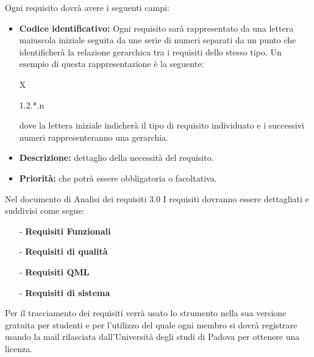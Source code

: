 \documentclass[a4paper,11pt]{article}
\begin{document}
			Ogni requisito dovrà avere i seguenti campi:
			\begin{itemize}
			\item \textbf{Codice identificativo:} 
			Ogni requisito sarà rappresentato da una lettera maiuscola iniziale seguita da une serie di numeri separati da un punto che identificherà la relazione gerarchica tra i requisiti dello stesso tipo. Un esempio di questa rappresentazione è la seguente:
					\begin{center}
					\begin{Large} X\end{Large}  \begin{normalsize}1.2.*.n	\end{normalsize}					
					\end{center}
					dove la lettera iniziale indicherà il tipo di requisito individuato e i successivi numeri rappresenteranno una gerarchia.					
			
			\item \textbf{Descrizione:} dettaglio della necessità del requisito.
			\item \textbf{Priorità:} che potrà essere obbligatoria o facoltativa.
			\end{itemize}
			Nel documento di Analisi dei requisiti 3.0
			I requisiti dovranno essere dettagliati  e suddivisi come segue:
			\begin{itemize}
			\item[-] \textbf{Requisiti Funzionali}
			\item[-] \textbf{Requisiti di qualità}
			\item[-] \textbf{Requisiti QML}
			\item[-] \textbf{Requisiti di sistema}
			\end{itemize}

	
			Per il tracciamento dei requisiti verrà usato lo strumento   nella sua versione gratuita per studenti e per l'utilizzo del quale ogni membro si dovrà registrare usando la mail rilasciata dall'Università degli studi di Padova per ottenere una licenza.  
			
\end{document}
